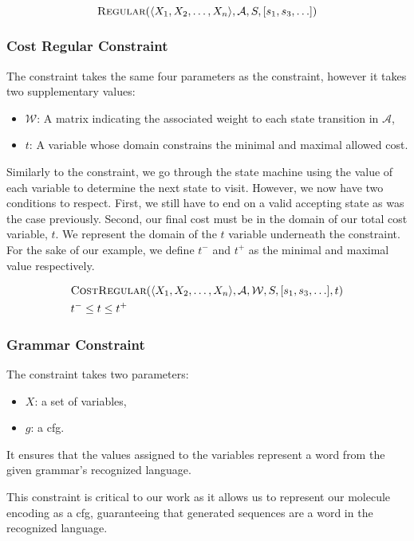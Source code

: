 \documentclass[../Document.tex]{subfiles}
\begin{document}
$$
    \mbox{\sc Regular}(\langle X_1, X_2, \ldots, X_n \rangle, \mathcal{A}, S, [s_1, s_3, \ldots])
$$

\subsubsection{Cost Regular Constraint}
The \costregular constraint takes the same four parameters as the \regular constraint, however it takes two supplementary values:
\begin{itemize}
    \item $\mathcal{W}$: A matrix indicating the associated weight to each state transition in $\mathcal{A}$,
    \item $t$: A variable whose domain constrains the minimal and maximal allowed cost.
\end{itemize}

Similarly to the \regular constraint, we go through the state machine using the value of each variable to determine the next state to visit.
However, we now have two conditions to respect. First, we still have to end on a valid accepting state as was the case previously. Second, our final cost must be in the domain of our total cost variable, $t$.
We represent the domain of the $t$ variable underneath the \costregular constraint. For the sake of our example, we define $t^-$ and $t^+$ as the minimal and maximal value respectively.

\begin{align*}
    &\mbox{\sc CostRegular}(\langle X_1, X_2, \ldots, X_n \rangle, \mathcal{A}, \mathcal{W}, S, [s_1, s_3, \ldots], t)\\
    &t^- \leq t \leq t^+
\end{align*}

\subsubsection{Grammar Constraint}
The \grammar constraint takes two parameters:
\begin{itemize}
    \item $X$: a set of variables,
    \item $g$: a \acrfull{cfg}.
\end{itemize}

It ensures that the values assigned to the variables represent a word from the given grammar's recognized language.

This constraint is critical to our work as it allows us to represent our molecule encoding as a \gls{cfg}, guaranteeing that generated sequences are a word in the recognized language.
\end{document}
